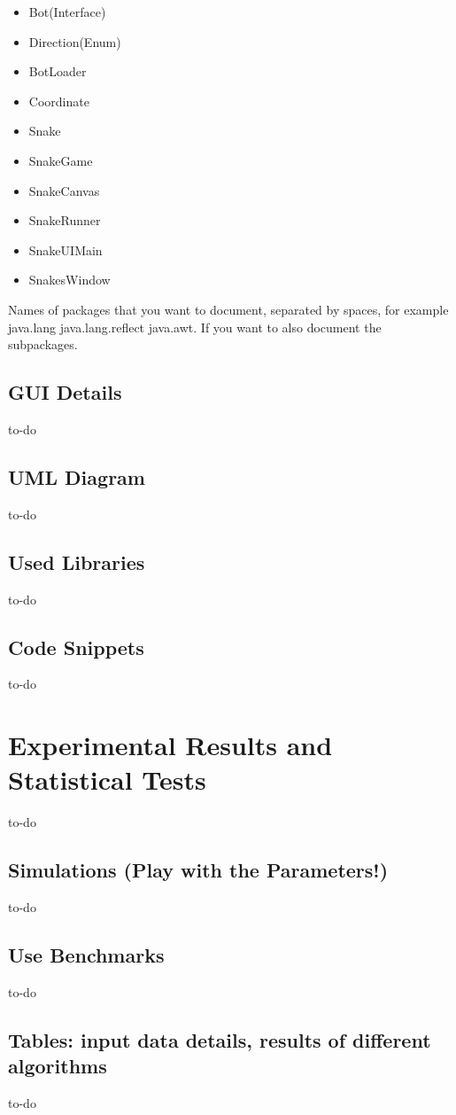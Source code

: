 \documentclass[a4paper,12pt]{article}
\begin{document}
\begin{itemize}
\item Bot(Interface)
\item Direction(Enum)
\item BotLoader
\item Coordinate
\item Snake
\item SnakeGame
\item SnakeCanvas
\item SnakeRunner
\item SnakeUIMain
\item SnakesWindow
\end{itemize}

Names of packages that you want to document, separated by spaces, for example java.lang java.lang.reflect java.awt. If you want to also document the subpackages.

\subsection{GUI Details}
to-do
\subsection{UML Diagram}
to-do
\subsection{Used Libraries}
to-do
\subsection{Code Snippets}
to-do

\section{Experimental Results and Statistical Tests}
to-do
\subsection{Simulations (Play with the Parameters!)}
to-do
\subsection{Use Benchmarks}
to-do
\subsection{Tables: input data details, results of different algorithms}
to-do
\end{document}
